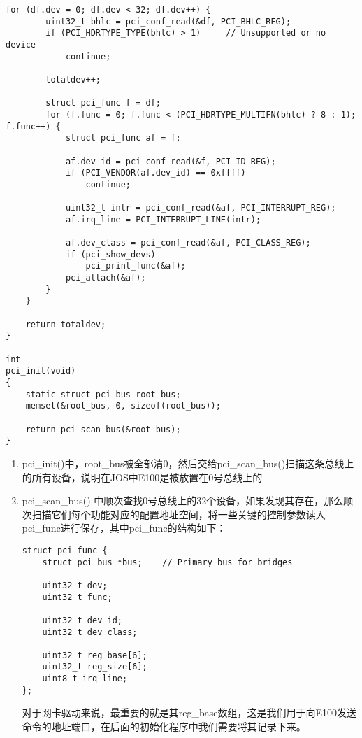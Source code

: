 \documentclass{article}
\newcommand{\funcname}[1]{{\ttfamily \small #1}}
\begin{document}
\begin{CJK*}{UTF8}{gkai}
\begin{lstlisting}[style=ccode, firstnumber=36, title={\scriptsize \ttfamily \bfseries kern/pci.c}]
    for (df.dev = 0; df.dev < 32; df.dev++) {
        uint32_t bhlc = pci_conf_read(&df, PCI_BHLC_REG);
        if (PCI_HDRTYPE_TYPE(bhlc) > 1)	    // Unsupported or no device
            continue;
		
        totaldev++;
		
        struct pci_func f = df;
        for (f.func = 0; f.func < (PCI_HDRTYPE_MULTIFN(bhlc) ? 8 : 1); f.func++) {
            struct pci_func af = f;
			
            af.dev_id = pci_conf_read(&f, PCI_ID_REG);
            if (PCI_VENDOR(af.dev_id) == 0xffff)
                continue;
			
            uint32_t intr = pci_conf_read(&af, PCI_INTERRUPT_REG);
            af.irq_line = PCI_INTERRUPT_LINE(intr);
			
            af.dev_class = pci_conf_read(&af, PCI_CLASS_REG);
            if (pci_show_devs)
                pci_print_func(&af);
            pci_attach(&af);
        }
    }
	
    return totaldev;
}

int
pci_init(void)
{
	static struct pci_bus root_bus;
	memset(&root_bus, 0, sizeof(root_bus));
	
	return pci_scan_bus(&root_bus);
}
\end{lstlisting}

\begin{enumerate}
\item{\funcname{pci\_init()}中，root\_bus被全部清0，然后交给\funcname{pci\_scan\_bus()}扫描这条总线上的所有设备，说明在JOS中E100是被放置在0号总线上的}
\item{\funcname{pci\_scan\_bus()} 中顺次查找0号总线上的32个设备，如果发现其存在，那么顺次扫描它们每个功能对应的配置地址空间，将一些关键的控制参数读入pci\_func进行保存，其中pci\_func的结构如下：

\begin{lstlisting}[style=ccode, firstnumber=11, title={\scriptsize \ttfamily \bfseries kern/pci.h}]
struct pci_func {
    struct pci_bus *bus;	// Primary bus for bridges

    uint32_t dev;
    uint32_t func;

    uint32_t dev_id;
    uint32_t dev_class;

    uint32_t reg_base[6];
    uint32_t reg_size[6];
    uint8_t irq_line;
};
\end{lstlisting}

对于网卡驱动来说，最重要的就是其reg\_base数组，这是我们用于向E100发送命令的地址端口，在后面的初始化程序中我们需要将其记录下来。

}
\end{enumerate}
\end{CJK*}
\end{document}
